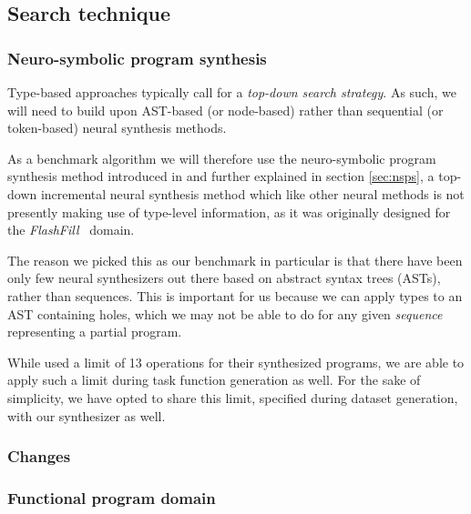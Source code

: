 \documentclass{article}
\begin{document}
\subsection{Search technique}

\subsubsection{Neuro-symbolic program synthesis}

Type-based approaches typically call for a \emph{top-down search strategy}.
As such, we will need to build upon AST-based (or node-based) rather than sequential (or token-based) neural synthesis methods.

As a benchmark algorithm we will therefore use the neuro-symbolic program synthesis method introduced in \citet{nsps} and further explained in section \ref{sec:nsps},
a top-down incremental neural synthesis method which like other neural methods is not presently making use of type-level information,
as it was originally designed for the \emph{FlashFill}~\citep{prose} domain.

The reason we picked this as our benchmark in particular is that there have been only few neural synthesizers out there based on abstract syntax trees (ASTs), rather than sequences.
This is important for us because we can apply types to an AST containing holes,
which we may not be able to do for any given \emph{sequence} representing a partial program.

While \citet{nsps} used a limit of 13 operations for their synthesized programs,
we are able to apply such a limit during task function generation as well.
For the sake of simplicity, we have opted to share this limit,
specified during dataset generation,
with our synthesizer as well.

\subsubsection{Changes}

\subsubsection{Functional program domain}
\end{document}
